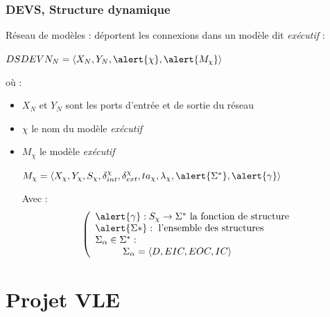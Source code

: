 \documentclass[xetex, compress, table, dvipsnames]{beamer}
\begin{document}
\begin{frame}
  \frametitle{DEVS, Structure dynamique}
  \begin{exampleblock}{}
    Réseau de modèles : déportent les connexions dans un modèle dit
    \emph{exécutif} :
    \begin{center}
      $DSDEVN_N = \langle X_N, Y_N, \alert{\chi}, \alert{M_{\chi}}
      \rangle$
    \end{center}
  \end{exampleblock}
  \begin{exampleblock}{}
    où :\\
    \begin{itemize}
    \item $X_N$ et $Y_N$ sont les ports d'entrée et de sortie du réseau
    \item $\chi$ le nom du modèle \emph{exécutif}
    \item $M_\chi$ le modèle \emph{exécutif}\\
      \begin{center}
        $M_\chi = \langle X_\chi, Y_\chi, S_\chi, \delta_{int}^\chi,
        \delta_{ext}^\chi, ta_{\chi}, \lambda_{\chi}, \alert{\Sigma^*},
        \alert{\gamma}\rangle$
      \end{center}
      Avec :
      $$\left(
        \begin{array}{l}
          \alert{\gamma} : S_\chi \rightarrow \Sigma^*\text{ la fonction de
            structure}\\
          \alert{\Sigma*} : \text{ l'ensemble des structures}\\
          \Sigma_\alpha \in \Sigma^* :\\
          \hspace{1cm}\Sigma_\alpha = \langle D, EIC, EOC, IC \rangle
        \end{array}
      \right.$$
    \end{itemize}
  \end{exampleblock}
\end{frame}

\section{Projet VLE}
\end{document}

